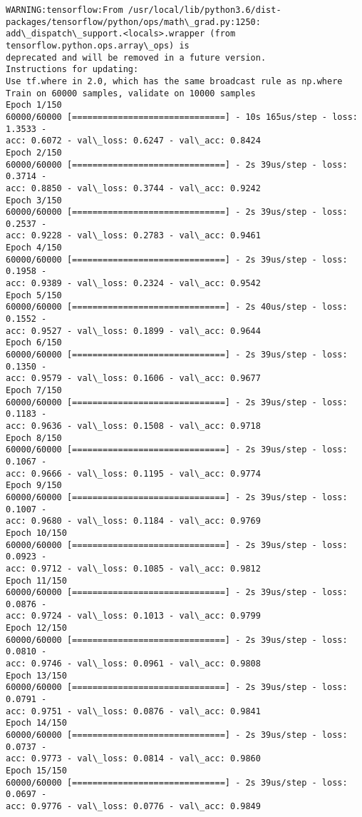 \documentclass[11pt]{article}
\begin{document}
    \begin{Verbatim}[commandchars=\\\{\}]
WARNING:tensorflow:From /usr/local/lib/python3.6/dist-
packages/tensorflow/python/ops/math\_grad.py:1250:
add\_dispatch\_support.<locals>.wrapper (from tensorflow.python.ops.array\_ops) is
deprecated and will be removed in a future version.
Instructions for updating:
Use tf.where in 2.0, which has the same broadcast rule as np.where
Train on 60000 samples, validate on 10000 samples
Epoch 1/150
60000/60000 [==============================] - 10s 165us/step - loss: 1.3533 -
acc: 0.6072 - val\_loss: 0.6247 - val\_acc: 0.8424
Epoch 2/150
60000/60000 [==============================] - 2s 39us/step - loss: 0.3714 -
acc: 0.8850 - val\_loss: 0.3744 - val\_acc: 0.9242
Epoch 3/150
60000/60000 [==============================] - 2s 39us/step - loss: 0.2537 -
acc: 0.9228 - val\_loss: 0.2783 - val\_acc: 0.9461
Epoch 4/150
60000/60000 [==============================] - 2s 39us/step - loss: 0.1958 -
acc: 0.9389 - val\_loss: 0.2324 - val\_acc: 0.9542
Epoch 5/150
60000/60000 [==============================] - 2s 40us/step - loss: 0.1552 -
acc: 0.9527 - val\_loss: 0.1899 - val\_acc: 0.9644
Epoch 6/150
60000/60000 [==============================] - 2s 39us/step - loss: 0.1350 -
acc: 0.9579 - val\_loss: 0.1606 - val\_acc: 0.9677
Epoch 7/150
60000/60000 [==============================] - 2s 39us/step - loss: 0.1183 -
acc: 0.9636 - val\_loss: 0.1508 - val\_acc: 0.9718
Epoch 8/150
60000/60000 [==============================] - 2s 39us/step - loss: 0.1067 -
acc: 0.9666 - val\_loss: 0.1195 - val\_acc: 0.9774
Epoch 9/150
60000/60000 [==============================] - 2s 39us/step - loss: 0.1007 -
acc: 0.9680 - val\_loss: 0.1184 - val\_acc: 0.9769
Epoch 10/150
60000/60000 [==============================] - 2s 39us/step - loss: 0.0923 -
acc: 0.9712 - val\_loss: 0.1085 - val\_acc: 0.9812
Epoch 11/150
60000/60000 [==============================] - 2s 39us/step - loss: 0.0876 -
acc: 0.9724 - val\_loss: 0.1013 - val\_acc: 0.9799
Epoch 12/150
60000/60000 [==============================] - 2s 39us/step - loss: 0.0810 -
acc: 0.9746 - val\_loss: 0.0961 - val\_acc: 0.9808
Epoch 13/150
60000/60000 [==============================] - 2s 39us/step - loss: 0.0791 -
acc: 0.9751 - val\_loss: 0.0876 - val\_acc: 0.9841
Epoch 14/150
60000/60000 [==============================] - 2s 39us/step - loss: 0.0737 -
acc: 0.9773 - val\_loss: 0.0814 - val\_acc: 0.9860
Epoch 15/150
60000/60000 [==============================] - 2s 39us/step - loss: 0.0697 -
acc: 0.9776 - val\_loss: 0.0776 - val\_acc: 0.9849

\end{Verbatim}
\end{document}
